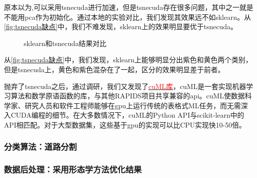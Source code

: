 \documentclass[12pt,hyperref,a4paper,UTF8]{ctexart}
\begin{document}
{\par
原本以为,可以采用tsnecuda进行加速，但是tsnecuda存在很多问题，其中之一就是不能用pca作为初始化。通过本地的实验对比，我们发现其效果远不如sklearn。从\autoref{fig:tsnecuda缺点}中，我们不难发现，sklearn上的效果明显要优于tsnecuda。
\begin{figure}[htbp]
	\centering
	\caption{sklearn和tsnecuda结果对比}
	\label{fig:tsnecuda缺点}
\end{figure}

从\autoref{fig:tsnecuda缺点}中，我们发现，sklearn上能够明显分出紫色和黄色两个类别，但是tsnecuda上，黄色和紫色混杂在了一起，区分的效果明显差于前者。

\par
抛弃了tsnecuda之后，通过调研，我们又发现了\href{https://github.com/rapidsai/cuml}{\textcolor{red}{cuML库}}，cuML是一套实现机器学习算法和数学原语函数的库，与其他RAPIDS项目共享兼容的api。cuML使数据科学家、研究人员和软件工程师能够在gpu上运行传统的表格式ML任务，而无需深入CUDA编程的细节。在大多数情况下，cuML的Python API与scikit-learn中的API相匹配。对于大型数据集，这些基于gpu的实现可以比CPU实现快10-50倍。





\subsubsection{分类算法：道路分割}


\subsubsection{数据后处理：采用形态学方法优化结果}


}
\end{document}
